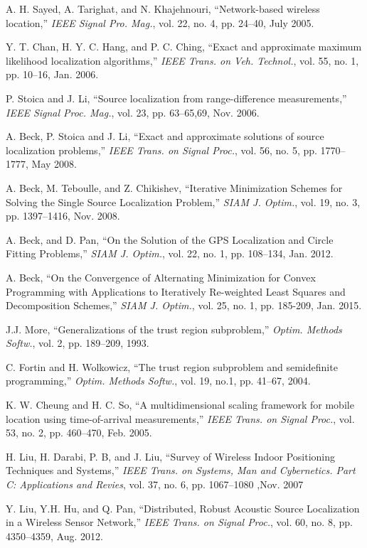 \begin{thebibliography}{99}
A. H. Sayed, A. Tarighat, and N. Khajehnouri, ``Network-based wireless location,'' {\em IEEE Signal Pro. Mag.}, vol. 22, no. 4, pp. 24--40, July 2005.

 Y. T. Chan, H. Y. C. Hang, and P. C. Ching, ``Exact and approximate maximum likelihood localization algorithms,'' {\em IEEE Trans. on Veh. Technol.}, vol. 55, no. 1, pp. 10--16, Jan. 2006.

P. Stoica and J. Li, ``Source localization from range-difference measurements,'' {\em IEEE Signal Proc. Mag.}, vol. 23, pp. 63--65,69, Nov. 2006.

A. Beck, P. Stoica and J. Li,  ``Exact and approximate solutions of source localization problems,'' {\em IEEE Trans. on Signal Proc.}, vol. 56, no. 5, pp. 1770--1777, May 2008.

A. Beck, M. Teboulle, and Z. Chikishev, ``Iterative Minimization Schemes for Solving the Single Source Localization Problem,''  {\em SIAM J. Optim.}, vol. 19, no. 3, pp. 1397--1416, Nov. 2008.

A. Beck, and D. Pan, ``On the Solution of the GPS Localization and Circle Fitting Problems,''  {\em SIAM J. Optim.}, vol. 22, no. 1, pp. 108--134, Jan. 2012.

A. Beck, ``On the Convergence of Alternating Minimization for Convex Programming with Applications to Iteratively Re-weighted Least Squares and Decomposition Schemes,''  {\em SIAM J. Optim.}, vol. 25, no. 1, pp. 185-209, Jan. 2015.

J.J. More, ``Generalizations of the trust region subproblem,'' {\em Optim. Methods Softw.}, vol. 2, pp. 189--209, 1993.

C. Fortin and H. Wolkowicz, ``The trust region subproblem and semidefinite programming,'' {\em Optim. Methods Softw.}, vol. 19, no.1, pp. 41--67, 2004.

K. W. Cheung and H. C. So, ``A multidimensional scaling framework for mobile location using time-of-arrival measurements,'' {\em IEEE Trans. on Signal Proc.}, vol. 53, no. 2, pp. 460--470, Feb. 2005.

H. Liu, H. Darabi, P. B, and J. Liu, ``Survey of Wireless Indoor Positioning Techniques and Systems,'' {\em IEEE Trans. on Systems, Man and Cybernetics. Part C: Applications and Revies}, vol. 37, no. 6, pp. 1067--1080 ,Nov. 2007

Y. Liu, Y.H. Hu, and Q. Pan, ``Distributed, Robust Acoustic Source Localization in a Wireless Sensor Network,'' {\em IEEE Trans. on Signal Proc.}, vol. 60, no. 8, pp. 4350--4359, Aug. 2012.


\end{thebibliography}
